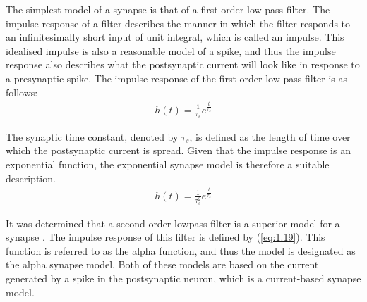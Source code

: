 \noindent The simplest model of a synapse is that of a first-order low-pass filter. The impulse response of a filter describes the manner in which the filter responds to an infinitesimally short input of unit integral, which is called an impulse. This idealised impulse is also a reasonable model of a spike, and thus the impulse response also describes what the postsynaptic current will look like in response to a presynaptic spike. The impulse response of the first-order low-pass filter is as follows:
\begin{align}
h(t) = \frac{1}{\tau_s}e^{\frac{t}{\tau_s}} \label{eq:1.18} 
\end{align}

\noindent The synaptic time constant, denoted by $\tau_s$, is defined as the length of time over which the postsynaptic current is spread. Given that the impulse response is an exponential function, the exponential synapse model is therefore a suitable description.
\begin{align}
h(t) = \frac{1}{\tau_s^2}e^{\frac{t}{\tau_s}} \label{eq:1.19} 
\end{align}

\noindent It was determined that a second-order lowpass filter is a superior model for a synapse \cite{mainen1995reliability}. The impulse response of this filter is defined by (\ref{eq:1.19}). This function is referred to as the alpha function, and thus the model is designated as the alpha synapse model. Both of these models are based on the current generated by a spike in the postsynaptic neuron, which is a current-based synapse model.\\




